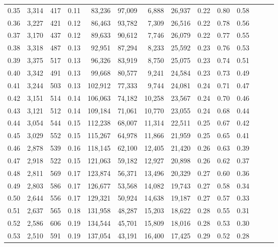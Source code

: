 \begin{tabular}{rrrrrrrrrrrrrr}
0.35 &  3,314 &  417 &  0.11 &   83,236 &   97,009 &   6,888 &  26,937 &  0.22 &  0.80 &      0.58 \\
0.36 &  3,227 &  421 &  0.12 &   86,463 &   93,782 &   7,309 &  26,516 &  0.22 &  0.78 &      0.56 \\
0.37 &  3,170 &  437 &  0.12 &   89,633 &   90,612 &   7,746 &  26,079 &  0.22 &  0.77 &      0.55 \\
0.38 &  3,318 &  487 &  0.13 &   92,951 &   87,294 &   8,233 &  25,592 &  0.23 &  0.76 &      0.53 \\
0.39 &  3,375 &  517 &  0.13 &   96,326 &   83,919 &   8,750 &  25,075 &  0.23 &  0.74 &      0.51 \\
0.40 &  3,342 &  491 &  0.13 &   99,668 &   80,577 &   9,241 &  24,584 &  0.23 &  0.73 &      0.49 \\
0.41 &  3,244 &  503 &  0.13 &  102,912 &   77,333 &   9,744 &  24,081 &  0.24 &  0.71 &      0.47 \\
0.42 &  3,151 &  514 &  0.14 &  106,063 &   74,182 &  10,258 &  23,567 &  0.24 &  0.70 &      0.46 \\
0.43 &  3,121 &  512 &  0.14 &  109,184 &   71,061 &  10,770 &  23,055 &  0.24 &  0.68 &      0.44 \\
0.44 &  3,054 &  544 &  0.15 &  112,238 &   68,007 &  11,314 &  22,511 &  0.25 &  0.67 &      0.42 \\
0.45 &  3,029 &  552 &  0.15 &  115,267 &   64,978 &  11,866 &  21,959 &  0.25 &  0.65 &      0.41 \\
0.46 &  2,878 &  539 &  0.16 &  118,145 &   62,100 &  12,405 &  21,420 &  0.26 &  0.63 &      0.39 \\
0.47 &  2,918 &  522 &  0.15 &  121,063 &   59,182 &  12,927 &  20,898 &  0.26 &  0.62 &      0.37 \\
0.48 &  2,811 &  569 &  0.17 &  123,874 &   56,371 &  13,496 &  20,329 &  0.27 &  0.60 &      0.36 \\
0.49 &  2,803 &  586 &  0.17 &  126,677 &   53,568 &  14,082 &  19,743 &  0.27 &  0.58 &      0.34 \\
0.50 &  2,644 &  556 &  0.17 &  129,321 &   50,924 &  14,638 &  19,187 &  0.27 &  0.57 &      0.33 \\
0.51 &  2,637 &  565 &  0.18 &  131,958 &   48,287 &  15,203 &  18,622 &  0.28 &  0.55 &      0.31 \\
0.52 &  2,586 &  606 &  0.19 &  134,544 &   45,701 &  15,809 &  18,016 &  0.28 &  0.53 &      0.30 \\
0.53 &  2,510 &  591 &  0.19 &  137,054 &   43,191 &  16,400 &  17,425 &  0.29 &  0.52 &      0.28 \\

\end{tabular}
